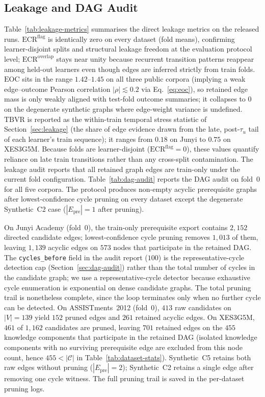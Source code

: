 \documentclass[pdflatex,sn-basic]{sn-jnl}
\newcommand{\Epre}{\ensuremath{E_{\text{pre}}}}
\newcommand{\KCs}{knowledge components}
\begin{document}
\subsection{Leakage and DAG Audit}
\label{sec:exp-audit}


Table~\ref{tab:leakage-metrics} summarises the direct leakage metrics on
the released runs. $\mathrm{ECR}^{\mathrm{flag}}$ is identically zero on every dataset (fold means), confirming learner-disjoint splits and structural leakage freedom at the evaluation protocol level; $\mathrm{ECR}^{\mathrm{overlap}}$ stays near unity because recurrent transition patterns reappear among held-out learners even though edges are inferred strictly from train folds.
$\mathrm{EOC}$ sits in the range $1.42$--$1.45$ on all three public corpora
(implying a weak edge--outcome Pearson correlation $|\rho|\lesssim0.2$ via
Eq.~\eqref{eq:eoc}), so retained edge mass is only weakly aligned with
test-fold outcome summaries; it collapses to $0$ on the degenerate
synthetic graphs where edge-weight variance is undefined. $\mathrm{TBVR}$
is reported as the within-train temporal stress statistic of
Section~\ref{sec:leakage} (the share of edge evidence drawn from the
late, post-$\tau_u$ tail of each learner's train sequence); it ranges from
$0.18$ on Junyi to $0.75$ on XES3G5M. Because folds are learner-disjoint
($\mathrm{ECR}^{\mathrm{flag}}{=}0$), these values quantify reliance on
late train transitions rather than any cross-split contamination.
The leakage audit reports that all retained graph edges are train-only
under the current fold configuration. Table~\ref{tab:dag-audit} reports
the DAG audit on fold~0 for all five corpora. The protocol produces
non-empty acyclic prerequisite graphs after lowest-confidence cycle
pruning on every dataset except the degenerate Synthetic~C2 case
($|\Epre|{=}1$ after pruning).

On Junyi Academy (fold~0), the train-only prerequisite export contains
$2{,}152$ directed candidate edges; lowest-confidence cycle pruning
removes $1{,}013$ of them, leaving $1{,}139$ acyclic edges on
$573$ nodes that participate in the retained DAG. The
\texttt{cycles\_before} field in the audit report ($100$) is the
representative-cycle detection cap (Section~\ref{sec:dag-audit}) rather
than the total number of cycles in the candidate graph; we use a
representative-cycle detector because exhaustive cycle enumeration is
exponential on dense candidate graphs. The total pruning trail is
nonetheless complete, since the loop terminates only when no further
cycle can be detected. On ASSISTments~2012 (fold~0), $413$ raw
candidates on $|V|{=}139$ yield $152$ pruned edges and $261$ retained
acyclic edges. On XES3G5M, $461$ of $1{,}162$ candidates are pruned,
leaving $701$ retained edges on the $455$ \KCs{} that participate in the
retained DAG (isolated \KCs{} with no surviving prerequisite edge are
excluded from this node count, hence $455<|\mathcal{C}|$ in
Table~\ref{tab:dataset-stats}). Synthetic~C5 retains both
raw edges without pruning ($|\Epre|{=}2$); Synthetic~C2 retains a
single edge after removing one cycle witness. The full pruning trail
is saved in the per-dataset pruning logs.
\end{document}
